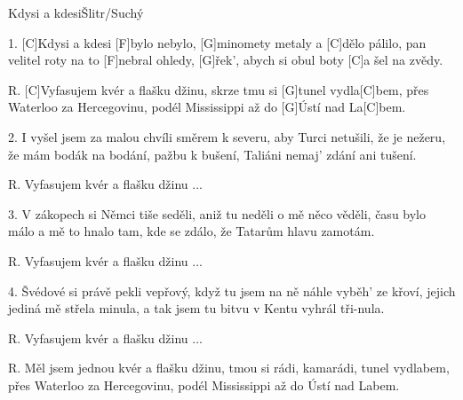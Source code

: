 \begin{song}{Kdysi a kdesi}{Šlitr/Suchý}

\begin{xverse}{1. }
[C]Kdysi a kdesi [F]bylo nebylo,
[G]minomety metaly a [C]dělo pálilo,
pan velitel roty na to [F]nebral ohledy,
[G]{řek'}, abych si obul boty [C]{a šel} na zvědy.
\end{xverse}


\begin{xverse}{R. }
[C]Vyfasujem kvér a flašku džinu,
skrze tmu si [G]tunel vydla[C]bem,
přes Waterloo za Hercegovinu,
podél Mississippi až do [G]{Ústí} nad La[C]bem.
\end{xverse}


\begin{xverse}{2. }
I vyšel jsem za malou chvíli směrem k severu,
aby Turci netušili, že je nežeru,
že mám bodák na bodání, pažbu k bušení,
Taliáni nemaj' zdání ani tušení.
\end{xverse}


\begin{xverse}{R. }
Vyfasujem kvér a flašku džinu ...
\end{xverse}


\begin{xverse}{3. }
V zákopech si Němci tiše seděli,
aniž tu neděli o mě něco věděli,
času bylo málo a mě to hnalo tam,
kde se zdálo, že Tatarům hlavu zamotám.
\end{xverse}


\begin{xverse}{R. }
Vyfasujem kvér a flašku džinu ...
\end{xverse}

\begin{xverse}{4. }
Švédové si právě pekli vepřový,
když tu jsem na ně náhle vyběh' ze křoví,
jejich jediná mě střela minula,
a tak jsem tu bitvu v Kentu vyhrál tři-nula.
\end{xverse}


\begin{xverse}{R. }
Vyfasujem kvér a flašku džinu ...
\end{xverse}

\begin{xverse}{R. }
Měl jsem jednou kvér a flašku džinu,
tmou si rádi, kamarádi, tunel vydlabem,
přes Waterloo za Hercegovinu,
podél Mississippi až do Ústí nad Labem.
\end{xverse}

\end{song}

